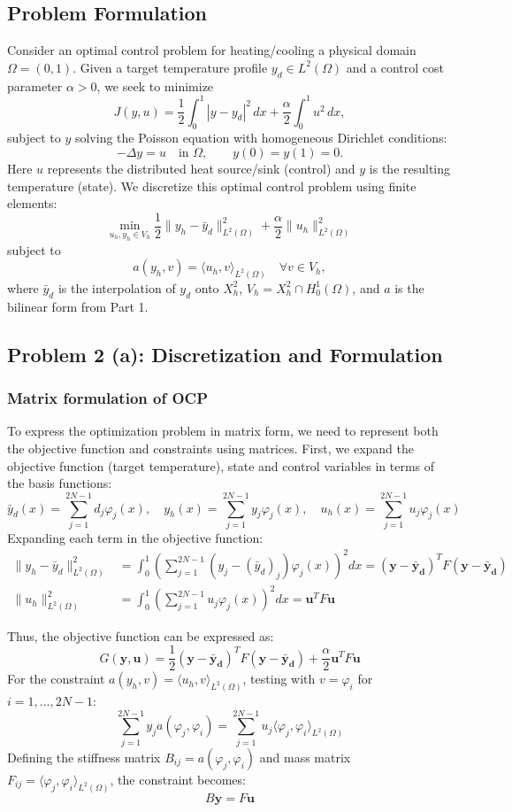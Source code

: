 \subsection*{Problem Formulation}
Consider an optimal control problem for heating/cooling a physical domain \(\Omega=(0,1)\).
Given a target temperature profile \(y_d \in L^2(\Omega)\) and a control cost parameter \(\alpha > 0\), we seek to minimize
\[
	J(y,u) = \frac{1}{2}\int_0^1 |y-y_d|^2\,dx + \frac{\alpha}{2}\int_0^1 u^2\,dx,
\]
subject to \(y\) solving the Poisson equation with homogeneous Dirichlet conditions:
\[
	-\Delta y = u \quad\text{in }\Omega, \qquad y(0) = y(1) = 0.
\]
Here \(u\) represents the distributed heat source/sink (control) and \(y\) is the resulting temperature (state).
We discretize this optimal control problem using finite elements:
\[
	\min_{u_h,y_h\in V_h} \frac{1}{2}\|y_h - \bar{y}_d\|^2_{L^2(\Omega)} + \frac{\alpha}{2}\|u_h\|^2_{L^2(\Omega)}
\]
subject to
\[
	a(y_h,v) = \langle u_h,v \rangle_{L^2(\Omega)} \quad \forall v\in V_h,
\]
where \(\bar{y}_d\) is the interpolation of \(y_d\) onto \(X^2_h\), \(V_h = X^2_h \cap H^1_0(\Omega)\), and \(a\) is the bilinear form from Part 1.
\subsection*{Problem 2 (a): Discretization and Formulation}
\subsubsection*{Matrix formulation of OCP}
To express the optimization problem in matrix form, we need to represent both the objective function and constraints using matrices.
First, we expand the objective function (target temperature), state and control variables in terms of the basis functions:
\[
	\bar{y}_d(x) = \sum_{j=1}^{2N-1} d_j \varphi_j(x), \quad
	y_h(x) = \sum_{j=1}^{2N-1} y_j \varphi_j(x), \quad
	u_h(x) = \sum_{j=1}^{2N-1} u_j \varphi_j(x)
\]
Expanding each term in the objective function:
\begin{align*}
	\|y_h - \bar{y}_d\|^2_{L^2(\Omega)} & = \int_0^1 \left(\sum_{j=1}^{2N-1} (y_j-(\bar{y}_d)_j)\varphi_j(x)\right)^2 dx = (\mathbf{y}-\mathbf{\bar{y}_d})^T F (\mathbf{y}-\mathbf{\bar{y}_d}) \\
	\|u_h\|^2_{L^2(\Omega)}             & = \int_0^1 \left(\sum_{j=1}^{2N-1} u_j \varphi_j(x)\right)^2 dx = \mathbf{u}^T F \mathbf{u}
\end{align*}

Thus, the objective function can be expressed as:
\[
	G(\mathbf{y},\mathbf{u}) = \frac{1}{2}(\mathbf{y}-\mathbf{\bar{y}_d})^T F (\mathbf{y}-\mathbf{\bar{y}_d}) + \frac{\alpha}{2} \mathbf{u}^T F \mathbf{u}
\]
For the constraint \(a(y_h,v) = \langle u_h,v \rangle_{L^2(\Omega)}\), testing with \(v = \varphi_i\) for \(i=1,\dots,2N-1\):
\[
	\sum_{j=1}^{2N-1} y_j a(\varphi_j,\varphi_i) = \sum_{j=1}^{2N-1} u_j \langle \varphi_j,\varphi_i \rangle_{L^2(\Omega)}
\]
Defining the stiffness matrix \(B_{ij} = a(\varphi_j,\varphi_i)\) and mass matrix \(F_{ij} = \langle \varphi_j,\varphi_i \rangle_{L^2(\Omega)}\), the constraint becomes:
\[
	B \mathbf{y} = F \mathbf{u}
\]
